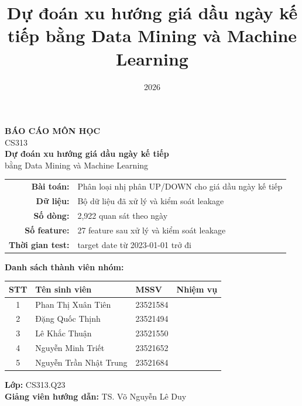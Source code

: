 \documentclass[10pt,a4paper]{article}
\title{Dự đoán xu hướng giá dầu ngày kế tiếp bằng Data Mining và Machine Learning}
\author{}
\date{2026}
\renewcommand{\arraystretch}{1.12}
\begin{document}
\pagestyle{plain}

\begin{titlepage}
    \centering
    \thispagestyle{empty}
    \vspace*{0.9cm}
    {\large \textbf{BÁO CÁO MÔN HỌC}}\\[0.25cm]
{\normalsize CS313}\\[1.25cm]

    {\LARGE \textbf{Dự đoán xu hướng giá dầu ngày kế tiếp}}\\[0.25cm]
    {\large bằng Data Mining và Machine Learning}\\[1.05cm]

    {\small
    \begin{tabular}{rl}
        \textbf{Bài toán:} & Phân loại nhị phân UP/DOWN cho giá dầu ngày kế tiếp \\
        \textbf{Dữ liệu:} & Bộ dữ liệu đã xử lý và kiểm soát leakage \\
        \textbf{Số dòng:} & 2,922 quan sát theo ngày \\
        \textbf{Số feature:} & 27 feature sau xử lý và kiểm soát leakage \\
        \textbf{Thời gian test:} & target date từ 2023-01-01 trở đi \\
    \end{tabular}
    }

    \vfill

    \textbf{Danh sách thành viên nhóm:}\\[0.35cm]

    {\small
    \renewcommand{\arraystretch}{1.22}
    \begin{tabular}{|c|l|l|l|}
    \hline
    \textbf{STT} & \textbf{Tên sinh viên} & \textbf{MSSV} & \textbf{Nhiệm vụ} \\
    \hline
    1 & Phan Thị Xuân Tiên & 23521584 & \\
    \hline
    2 & Đặng Quốc Thịnh & 23521494 & \\
    \hline
    3 & Lê Khắc Thuận & 23521550 & \\
    \hline
    4 & Nguyễn Minh Triết & 23521652 & \\
    \hline
    5 & Nguyễn Trần Nhật Trung & 23521684 & \\
    \hline
    \end{tabular}
    }

    \vspace{0.75cm}

    \textbf{Lớp:} CS313.Q23\\[0.55cm]
    \textbf{Giảng viên hướng dẫn:} TS. Võ Nguyễn Lê Duy

    \vspace*{0.7cm}
\end{titlepage}
\end{document}
